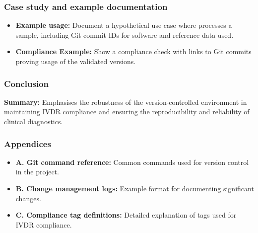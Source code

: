 \subsubsection{Case study and example documentation}
\begin{itemize}
    \item \textbf{Example usage:} Document a hypothetical use case where \dnasnake processes a sample, including Git commit IDs for software and reference data used.\\
    \item \textbf{Compliance Example:} Show a compliance check with links to Git commits proving usage of the validated versions.
\end{itemize}

\subsubsection{Conclusion}
\textbf{Summary:} Emphasises the robustness of the version-controlled environment in maintaining IVDR compliance and ensuring the reproducibility and reliability of clinical diagnostics.

\subsubsection{Appendices}
\begin{itemize}
    \item \textbf{A. Git command reference:} Common commands used for version control in the project.
    \item \textbf{B. Change management logs:} Example format for documenting significant changes.
    \item \textbf{C. Compliance tag definitions:} Detailed explanation of tags used for IVDR compliance.
\end{itemize}


